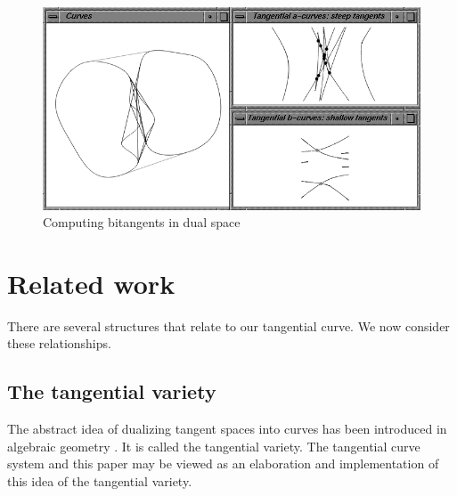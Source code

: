 \documentclass[12pt]{article}
\begin{document}
\begin{figure}[h]
\begin{center}
\includegraphics*[scale=.6]{img/jjdubi2.jpg}
\end{center}
\caption{Computing bitangents in dual space}
\label{fig:eg1}
\end{figure}



\section{Related work}
\label{sec:comparison}

There are several structures that relate to our tangential curve.
We now consider these relationships.


\subsection{The tangential variety}

The abstract idea of dualizing tangent spaces into curves
has been introduced in algebraic geometry \cite[p. 54]{hartshorne77}.
It is called the tangential variety.
The tangential curve system and this paper may be viewed as an elaboration
and implementation of this idea of the tangential variety.
\end{document}

